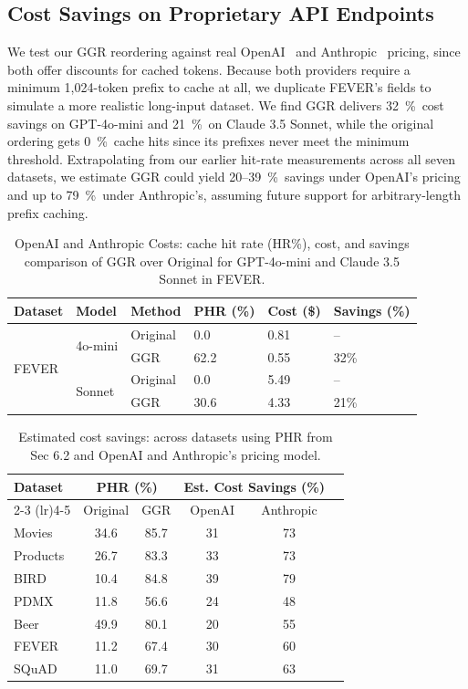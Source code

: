 \documentclass[manuscript,review]{acmart}
\begin{document}
\subsection{Cost Savings on Proprietary API Endpoints}
We test our GGR reordering against real OpenAI~\cite{openai_pricing} and Anthropic~\cite{anthropic_prompt_caching} pricing, since both offer discounts for cached tokens. Because both providers require a minimum 1,024-token prefix to cache at all, we duplicate FEVER's fields to simulate a more realistic long-input dataset. We find GGR delivers 32~\%\ cost savings on GPT-4o-mini and 21~\%\ on Claude 3.5 Sonnet, while the original ordering gets 0~\%\ cache hits since its prefixes never meet the minimum threshold. Extrapolating from our earlier hit-rate measurements across all seven datasets, we estimate GGR could yield 20–39~\%\ savings under OpenAI's pricing and up to 79~\%\ under Anthropic's, assuming future support for arbitrary-length prefix caching.
\begin{table}[h]
\centering
\begin{tabular}{llllll}
\toprule
Dataset & Model & Method & PHR (\%) & Cost (\$) & Savings (\%) \\
\midrule
\multirow{4}{*}{FEVER}
 & \multirow{2}{*}{4o-mini} & Original & 0.0  & 0.81 & -- \\
 &                          & GGR      & 62.2 & 0.55 & 32\% \\
 & \multirow{2}{*}{Sonnet}  & Original & 0.0  & 5.49 & -- \\
 &                          & GGR      & 30.6 & 4.33 & 21\% \\
\bottomrule
\end{tabular}
\caption{OpenAI and Anthropic Costs: cache hit rate (HR\%), cost,
and savings comparison of GGR over Original for GPT-4o-mini
and Claude 3.5 Sonnet in FEVER.}
\label{tab:openai-anthropic-costs}
\end{table}
\begin{table}[H]
\centering
\begin{tabular}{lccccc}
\toprule
\multirow{2}{*}{Dataset} & \multicolumn{2}{c}{PHR (\%)} & \multicolumn{2}{c}{Est. Cost Savings (\%)} \\
\cmidrule(lr){2-3} \cmidrule(lr){4-5}
 & Original & GGR & OpenAI & Anthropic \\
\midrule
Movies   & 34.6 & 85.7 & 31 & 73 \\
Products & 26.7 & 83.3 & 33 & 73 \\
BIRD     & 10.4 & 84.8 & 39 & 79 \\
PDMX     & 11.8 & 56.6 & 24 & 48 \\
Beer     & 49.9 & 80.1 & 20 & 55 \\
FEVER    & 11.2 & 67.4 & 30 & 60 \\
SQuAD    & 11.0 & 69.7 & 31 & 63 \\
\bottomrule
\end{tabular}
\caption{Estimated cost savings: across datasets using PHR from
Sec 6.2 and OpenAI and Anthropic's pricing model.}
\label{tab:estimated-cost-savings}
\end{table}
\end{document}
